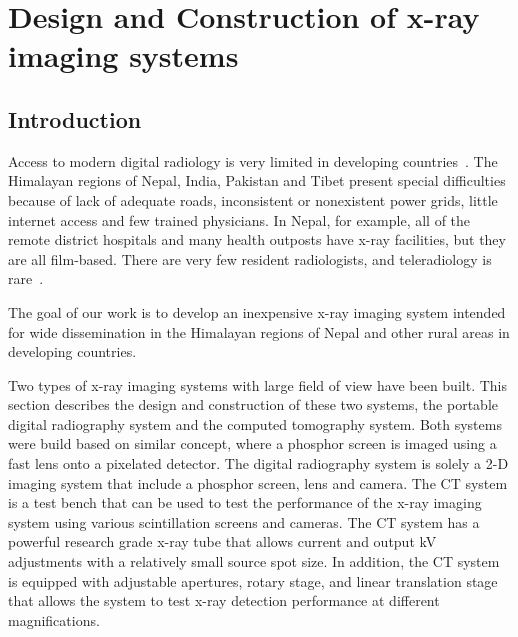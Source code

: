 \chapter{Design and Construction of x-ray imaging systems}
\label{chap:design_construction}

\section{Introduction}
Access to modern digital radiology is very limited in developing countries~\citep{telehealth2009}. The Himalayan regions of Nepal,
India, Pakistan and Tibet present special difficulties because of lack of adequate roads, inconsistent or nonexistent power
grids, little internet access and few trained physicians. In Nepal, for example, all of the remote district hospitals and
many health outposts have x-ray facilities, but they are all film-based. There are very few resident radiologists, and
teleradiology is rare~\citep{telehealth2009, Graham2003}.

The goal of our work is to develop an inexpensive x-ray imaging system intended for wide dissemination in the Himalayan regions of Nepal and other rural areas in developing countries.

Two types of x-ray imaging systems with large field of view have been built.  This section describes the design and construction of these two systems, the portable digital radiography system and the computed tomography system.  Both systems were build based on similar concept, where a phosphor screen is imaged using a fast lens onto a pixelated detector.  The digital radiography system is solely a 2-D imaging system that include a phosphor screen, lens and camera.  The CT system is a test bench that can be used to test the performance of the x-ray imaging system using various scintillation screens and cameras.  The CT system has a powerful research grade x-ray tube that allows current and output kV adjustments with a relatively small source spot size.  In addition, the CT system is equipped with adjustable apertures, rotary stage, and linear translation stage that allows the system to test x-ray detection performance at different magnifications.

